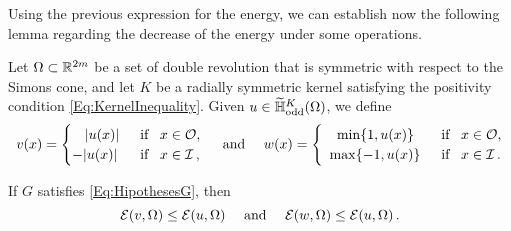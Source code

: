 Using the previous expression for the energy, we can establish now the following lemma regarding the decrease of the energy under some operations.
\begin{lemma}
\label{Lemma:DecreaseEnergy} 
Let $\Omega\subset \mathbb{R}^{2m}$ be a set of double revolution that is symmetric with respect to the Simons cone, and let $K$ be a radially symmetric kernel satisfying the positivity condition \eqref{Eq:KernelInequality}. Given $u\in\widetilde{\mathbb{H}}^K_{\mathrm{odd}}(\Omega)$, we define
\begin{equation*}
v(x) = \begin{cases}
\hspace{3.2mm}|u(x)| \,\,\, &\text{if } \,\,\, x\in\mathcal{O},\\
-|u(x)| \,\,\, &\text{if } \,\,\, x\in\mathcal{I}\, ,
\end{cases}
\quad 
\text{ and }
\quad
w(x) = \begin{cases}
\hspace{3.6mm}\min\{1,u(x)\} \,\,\, &\text{if } \,\,\, x\in\mathcal{O},\\
\,\,\,\max\{-1,u(x)\} \,\,\, &\text{if } \,\,\, x\in\mathcal{I}\,.
\end{cases}
\end{equation*}

If $G$ satisfies \eqref{Eq:HipothesesG}, then
$$ \mathcal{E}(v,\Omega) \leq \mathcal{E}(u,\Omega) \quad 
\text{ and }
\quad \mathcal{E}(w,\Omega) \leq \mathcal{E}(u,\Omega) \,.  $$
\end{lemma}

